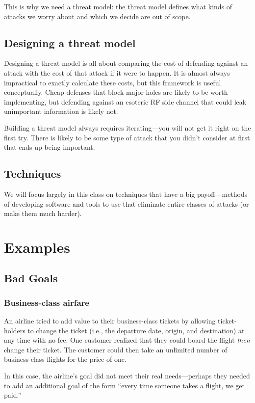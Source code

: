 This is why we need a threat model: the threat
model defines what kinds of attacks we worry about
and which we decide are out of scope.

\subsection{Designing a threat model}
Designing a threat model is all about comparing
the cost of defending against an attack with the
cost of that attack if it were to happen.
It is almost always impractical to exactly calculate
these costs, but this framework is useful
conceptually.
Cheap defenses that block major
holes are likely to be worth implementing, but
defending against an esoteric RF side channel that
could leak unimportant information is likely not.

Building a threat model always requires iterating---you will not get it right on the first try.
There is likely to be some type of attack that you didn't consider at first that ends up being important.

\subsection{Techniques}
We will focus largely in this class on techniques
that have a big payoff---methods of developing
software and tools to use that eliminate entire
classes of attacks (or make them much harder). 

\section{Examples}
\subsection{Bad Goals}
\subsubsection{Business-class airfare}
An airline tried to add value to their
business-class tickets by allowing ticket-holders to 
change the ticket (i.e., the departure date, origin, and destination)
at any time with no fee.
One customer realized that they could board the flight
\textit{then} change their ticket.
The customer could then take an unlimited number of
business-class flights for the price of one.

In this case, the airline's goal did not meet
their real needs---perhaps they needed to add
an additional goal of the form ``every time someone takes a flight,
we get paid.''

